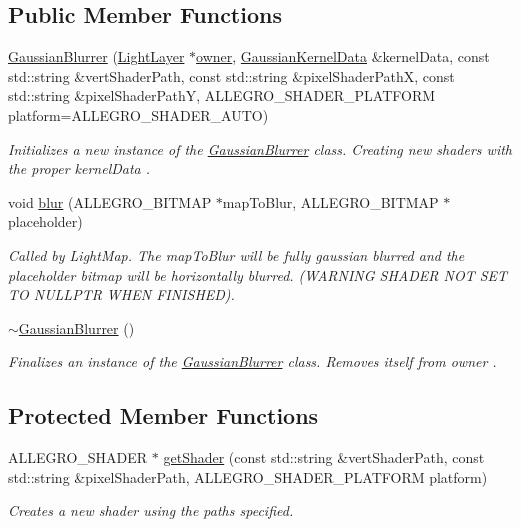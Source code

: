 \subsection*{Public Member Functions}
\begin{DoxyCompactItemize}
\item 
\hyperlink{classlighting_1_1GaussianBlurrer_ad6586426f68f4e7527261951fe39f995}{Gaussian\+Blurrer} (\hyperlink{classlighting_1_1LightLayer}{Light\+Layer} $\ast$\hyperlink{classlighting_1_1GaussianBlurrer_ae673db1b5f734d90a45628a33cc73bd1}{owner}, \hyperlink{classlighting_1_1GaussianKernelData}{Gaussian\+Kernel\+Data} \&kernel\+Data, const std\+::string \&vert\+Shader\+Path, const std\+::string \&pixel\+Shader\+PathX, const std\+::string \&pixel\+Shader\+PathY, A\+L\+L\+E\+G\+R\+O\+\_\+\+S\+H\+A\+D\+E\+R\+\_\+\+P\+L\+A\+T\+F\+O\+RM platform=A\+L\+L\+E\+G\+R\+O\+\_\+\+S\+H\+A\+D\+E\+R\+\_\+\+A\+U\+TO)
\begin{DoxyCompactList}\small\item\em Initializes a new instance of the \hyperlink{classlighting_1_1GaussianBlurrer}{Gaussian\+Blurrer} class. Creating new shaders with the proper {\itshape kernel\+Data} . \end{DoxyCompactList}\item 
void \hyperlink{classlighting_1_1GaussianBlurrer_a8422fd11341d886f0951552bdc038f5b}{blur} (A\+L\+L\+E\+G\+R\+O\+\_\+\+B\+I\+T\+M\+AP $\ast$map\+To\+Blur, A\+L\+L\+E\+G\+R\+O\+\_\+\+B\+I\+T\+M\+AP $\ast$placeholder)
\begin{DoxyCompactList}\small\item\em Called by Light\+Map. The {\itshape map\+To\+Blur}  will be fully gaussian blurred and the placeholder bitmap will be horizontally blurred. (W\+A\+R\+N\+I\+NG S\+H\+A\+D\+ER N\+OT S\+ET TO N\+U\+L\+L\+P\+TR W\+H\+EN F\+I\+N\+I\+S\+H\+ED). \end{DoxyCompactList}\item 
\hyperlink{classlighting_1_1GaussianBlurrer_ae3b3470c59d86f3837b639961f41cb13}{$\sim$\+Gaussian\+Blurrer} ()
\begin{DoxyCompactList}\small\item\em Finalizes an instance of the \hyperlink{classlighting_1_1GaussianBlurrer}{Gaussian\+Blurrer} class. Removes itself from {\itshape owner} . \end{DoxyCompactList}\end{DoxyCompactItemize}
\subsection*{Protected Member Functions}
\begin{DoxyCompactItemize}
\item 
A\+L\+L\+E\+G\+R\+O\+\_\+\+S\+H\+A\+D\+ER $\ast$ \hyperlink{classlighting_1_1GaussianBlurrer_a6c13e999dd54c2dbbbfb6af5ab800412}{get\+Shader} (const std\+::string \&vert\+Shader\+Path, const std\+::string \&pixel\+Shader\+Path, A\+L\+L\+E\+G\+R\+O\+\_\+\+S\+H\+A\+D\+E\+R\+\_\+\+P\+L\+A\+T\+F\+O\+RM platform)
\begin{DoxyCompactList}\small\item\em Creates a new shader using the paths specified. \end{DoxyCompactList}\end{DoxyCompactItemize}
